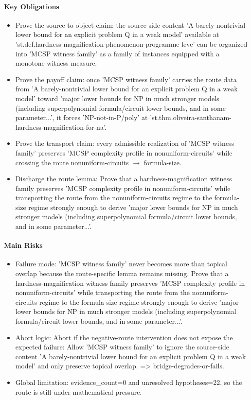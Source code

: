\documentclass[11pt]{article}
\begin{document}
\paragraph{Key Obligations}
\begin{itemize}[leftmargin=*,itemsep=0.2em]
\item Prove the source-to-object claim: the source-side content 'A barely-nontrivial lower bound for an explicit problem Q in a weak model' available at 'st.def.hardness-magnification-phenomenon-programme-leve' can be organized into 'MCSP witness family' as a family of instances equipped with a monotone witness measure.
\item Prove the payoff claim: once 'MCSP witness family' carries the route data from 'A barely-nontrivial lower bound for an explicit problem Q in a weak model' toward 'major lower bounds for NP in much stronger models (including superpolynomial formula/circuit lower bounds, and in some parameter...', it forces 'NP-not-in-P/poly' at 'st.thm.oliveira-santhanam-hardness-magnification-for-na'.
\item Prove the transport claim: every admissible realization of 'MCSP witness family' preserves 'MCSP complexity profile in nonuniform-circuits' while crossing the route nonuniform-circuits $\rightarrow$  formula-size.
\item Discharge the route lemma: Prove that a hardness-magnification witness family preserves 'MCSP complexity profile in nonuniform-circuits' while transporting the route from the nonuniform-circuits regime to the formula-size regime strongly enough to derive 'major lower bounds for NP in much stronger models (including superpolynomial formula/circuit lower bounds, and in some parameter...'.
\end{itemize}
\paragraph{Main Risks}
\begin{itemize}[leftmargin=*,itemsep=0.2em]
\item Failure mode: 'MCSP witness family' never becomes more than topical overlap because the route-specific lemma remains missing. Prove that a hardness-magnification witness family preserves 'MCSP complexity profile in nonuniform-circuits' while transporting the route from the nonuniform-circuits regime to the formula-size regime strongly enough to derive 'major lower bounds for NP in much stronger models (including superpolynomial formula/circuit lower bounds, and in some parameter...'.
\item Abort logic: Abort if the negative-route intervention does not expose the expected failure: Allow 'MCSP witness family' to ignore the source-side content 'A barely-nontrivial lower bound for an explicit problem Q in a weak model' and only preserve topical overlap. => bridge-degrades-or-fails.
\item Global limitation: evidence\_count=0 and unresolved hypotheses=22, so the route is still under mathematical pressure.
\end{itemize}
\end{document}
